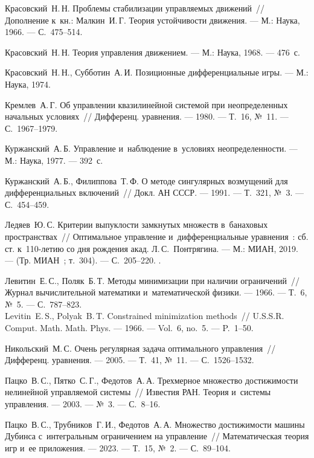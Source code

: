 \documentclass[../main.tex]{subfiles}
\begin{document}
\begin{thebibliography}{99}
Красовский~Н.\,Н. Проблемы стабилизации управляемых движений~// Дополнение к~кн.: Малкин~И.\,Г. Теория устойчивости движения. --- М.: Наука, 1966. --- С.~475--514.

Красовский~Н.\,Н. Теория управления движением. --- М.: Наука, 1968. --- 476~с.

Красовский~Н.\,Н., Субботин~А.\,И. Позиционные дифференциальные игры. --- М.: Наука, 1974.

Кремлев~А.\,Г. Об управлении квазилинейной системой при неопределенных начальных условиях~// Дифференц. уравнения. --- 1980. --- Т.~16, №~11. --- С.~1967--1979.

Куржанский~А.\,Б. Управление и~наблюдение в~условиях неопределенности. --- М.: Наука, 1977. --- 392~с.

Куржанский~А.\,Б., Филиппова~Т.\,Ф. О методе сингулярных возмущений для дифференциальных включений~// Докл. АН СССР. --- 1991. --- Т.~321, №~3. --- С.~454--459.

Ледяев~Ю.\,С. Критерии выпуклости замкнутых множеств в~банаховых пространствах~// Оптимальное управление и~дифференциальные уравнения~: сб. ст. к~110-летию со дня рождения акад. Л.\,С.~Понтрягина. --- М.: МИАН, 2019. --- (Тр. МИАН~; т.~304). --- С.~205--220. 
.

Левитин~Е.\,С., Поляк~Б.\,Т. Методы минимизации при наличии ограничений~// Журнал вычислительной математики и~математической физики. --- 1966. --- Т.~6, №~5. --- С.~787--823.
\\
Levitin~E.\,S., Polyak~B.\,T. Constrained minimization methods~// U.S.S.R. Comput. Math. Math. Phys. --- 1966. --- Vol.~6, no.~5. --- P.~1--50. 

Никольский~М.\,С. Очень регулярная задача оптимального управления~// Дифференц. уравнения. --- 2005. --- Т.~41, №~11. --- С.~1526--1532.

Пацко~В.\,С., Пятко~С.\,Г., Федотов~А.\,А. Трехмерное множество достижимости нелинейной управляемой системы~// Известия РАН. Теория и~системы управления. --- 2003. --- №~3. --- С.~8--16.

Пацко~В.\,С., Трубников~Г.\,И., Федотов~А.\,А. Множество достижимости машины Дубинса с~интегральным ограничением на управление~// Математическая теория игр и~ее приложения. --- 2023. --- Т.~15, №~2. --- С.~89--104.


\end{thebibliography}
\end{document}
